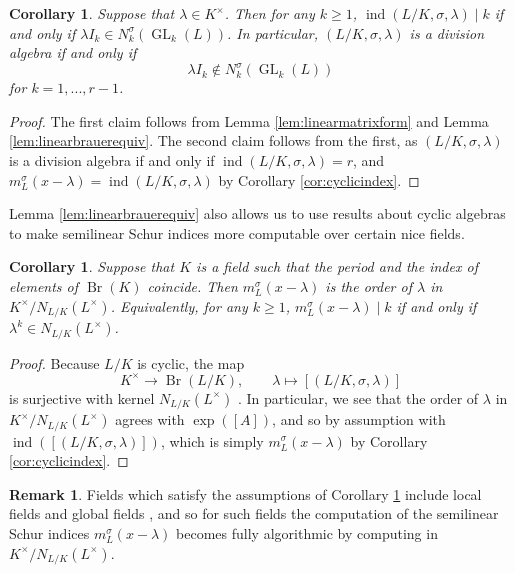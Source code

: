 \documentclass[10pt, reqno, hidelinks]{amsart}
\DeclareMathOperator{\ind}{ind}
\DeclareMathOperator{\Br}{Br}
\DeclareMathOperator{\GL}{GL}
\numberwithin{thm}{subsection}
\newtheorem{cor}[thm]{Corollary}
\theoremstyle{definition}
\newtheorem{remark}[thm]{Remark}
\begin{document}
\begin{cor}
    Suppose that $\lambda \in K^{\times}$. Then for any $k \geq 1$, $\ind(L/K,  \sigma, \lambda) \mid k$ if and only if $\lambda I_k \in N_k^{\sigma}(\GL_k(L))$. In particular, $(L/K,  \sigma, \lambda)$ is a division algebra if and only if
    \[
    \lambda I_k \not\in N_k^{\sigma}(\GL_k(L))
    \]
    for $k = 1, ... , r-1$.
\end{cor}

\begin{proof}
    The first claim follows from Lemma \ref{lem:linearmatrixform} and Lemma \ref{lem:linearbrauerequiv}. The second claim follows from the first, as $(L/K, \sigma,  \lambda)$ is a division algebra if and only if $\ind(L/K,  \sigma, \lambda) = r$, and $m_L^{\sigma}(x - \lambda) = \ind(L/K,  \sigma, \lambda)$ by Corollary \ref{cor:cyclicindex}.
\end{proof}

Lemma \ref{lem:linearbrauerequiv} also allows us to use results about cyclic algebras to make semilinear Schur indices more computable over certain nice fields.

\begin{cor}\label{cor:schurindexisorder}
    Suppose that $K$ is a field such that the period and the index of elements of $\Br(K)$ coincide. Then $m_L^{\sigma}(x- \lambda)$ is the order of $\lambda$ in $K^{\times} / N_{L / K}(L^{\times})$. Equivalently, for any $k \geq 1$, $m_L^{\sigma}(x - \lambda) \mid k$ if and only if $\lambda^k \in N_{L / K}(L^{\times})$.
\end{cor}

\begin{proof}
    Because $L / K$ is cyclic, the map
    \[
        K^{\times} \rightarrow \Br(L/K), \qquad \lambda \mapsto [(L/K,  \sigma, \lambda)]
    \]
    is surjective with kernel $N_{L/K}(L^{\times})$ \cite[\S 15.1, Prop.\ b]{PIE}. In particular, we see that the order of $\lambda$ in $K^{\times} / N_{L / K}(L^{\times})$ agrees with $\exp([A])$, and so by assumption with $\ind([(L/K, \sigma,  \lambda)])$, which is simply $m_L^{\sigma}(x- \lambda)$ by Corollary \ref{cor:cyclicindex}.
\end{proof}

\begin{remark}\label{rem:localandglobBrauerGroups}
Fields which satisfy the assumptions of Corollary \ref{cor:schurindexisorder} include local fields \cite[Rem.\ IV.4.4(b)]{milneCFT} and global fields \cite[Thm.\ VIII.2.6]{milneCFT}, and so for such fields the computation of the semilinear Schur indices $m_L^{\sigma}(x-\lambda)$ becomes fully algorithmic by computing in $K^{\times} / N_{L/K}(L^{\times})$.
\end{remark}
\end{document}
